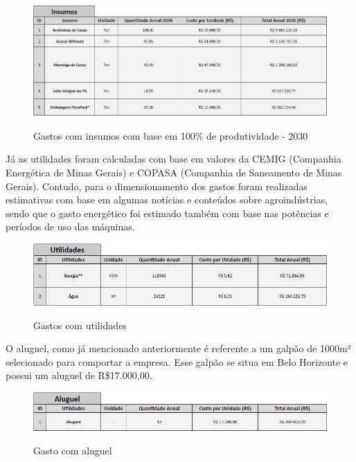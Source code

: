 \documentclass[
	12pt,				%
	openright,			%
	oneside,			%
	a4paper,			%
	english,			%
	french,				%
	spanish,			%
	brazil				%
	]{abntex2}
\begin{document}
\begin{figure}[H]
\begin{center}
\caption{Gastos com insumos com base em 100$\%$ de produtividade - 2030}
\includegraphics[scale=0.5]{1.jpeg} 
\label{1}
\end{center}
\end{figure}

Já as utilidades foram calculadas com base em valores da CEMIG (Companhia Energética de Minas Gerais) e COPASA (Companhia de Saneamento de Minas Gerais). Contudo, para o dimensionamento dos gastos foram realizadas estimativas com base em algumas notícias e conteúdos sobre agroindústrias, sendo que o gasto energético foi estimado também com base nas potências e períodos de uso das máquinas.


\begin{figure}[H]
\begin{center}
\caption{Gastos com utilidades}
\includegraphics[scale=0.55]{2.jpeg} 
\label{-}
\end{center}
\end{figure}

O aluguel, como já mencionado anteriormente é referente a um galpão de 1000m² selecionado para comportar a empresa. Esse galpão se situa em Belo Horizonte e possui um aluguel de R\$17.000,00.

\begin{figure}[H]
\begin{center}
\caption{Gasto com aluguel}
\includegraphics[scale=0.55]{3.jpeg} 
\label{-}
\end{center}
\end{figure}
\end{document}
